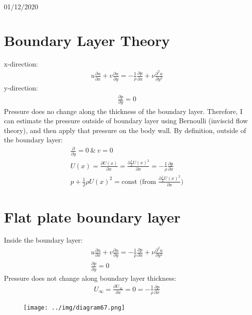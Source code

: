 \documentclass[class=report, crop=false, 12pt,a4paper]{standalone}
\begin{document}
\begin{center}
    01/12/2020
\end{center}
\section{Boundary Layer Theory}
x-direction:
\begin{align}
  u \frac{\partial u}{\partial x} + v \frac{\partial u}{\partial y} = - \frac{1}{\rho} \frac{\partial p}{\partial x} + \nu \frac{\partial^2 u}{\partial y^2}
\end{align}
y-direction:
\begin{align}
  \frac{\partial p}{\partial y} = 0
\end{align}
Pressure does no change along the thickness of the boundary layer. Therefore, I can estimate the pressure outside of boundary layer using Bernoulli (inviscid flow theory), and then apply that pressure on the body wall. By definition, outside of the boundary layer:
\begin{gather}
  \frac{\partial}{\partial y} = 0 \ \& \ v = 0\\
  U(x) = \frac{\partial U(x)}{\partial x} = \frac{\partial \frac{1}{2} U(x)^2}{\partial x} = - \frac{1}{\rho} \frac{\partial p}{\partial x}\\
  p + \frac{1}{2} \rho U(x)^2 = \textrm{const (from } \frac{\partial \frac{1}{2} U(x)^2}{\partial x}\textrm{)}
\end{gather}
\section{Flat plate boundary layer}
Inside the boundary layer:
\begin{align}
  u \frac{\partial u}{\partial x} + v\frac{\partial u}{\partial y} = -\frac{1}{\rho} \frac{\partial p}{\partial x} + \nu \frac{\partial^2 u}{\partial y^2}\\
  \frac{\partial p}{\partial y} = 0
\end{align}
Pressure does not change along boundary layer thickness:
\begin{align}
  U_\infty = \frac{\partial U_\infty}{\partial x} = 0 = -\frac{1}{\rho} \frac{\partial p}{\partial x}
\end{align}
\begin{figure}[H]
  \centering
  \texttt{[image: ../img/diagram67.png]}
\end{figure}
\end{document}
